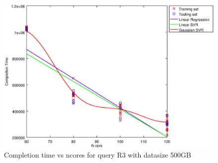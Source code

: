
\begin {figure}[hbtp]
\centering
\includegraphics[width=\textwidth]{output/R3_500_ONLY_1_LINEAR_NCORE/plot_R3_500_bestmodels.eps}
\caption{Completion time vs ncores for query R3 with datasize 500GB}
\label{fig:only_1_linear_R3_500}
\end {figure}
